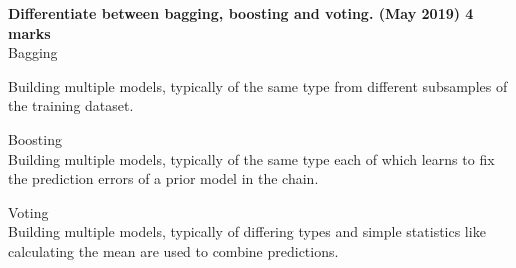 \textbf{\textcolor{LightMagenta}{Differentiate between bagging, boosting and voting. (May 2019) \hfill 4 marks}} \\[5pt]
\textcolor{ReddishRose} {Bagging} \\{ Building multiple models, typically of the same type from different subsamples of the training dataset. 

\textcolor{ReddishRose} {Boosting} \\ Building multiple models, typically of the same type each of which learns to fix the prediction errors of a prior model in the chain.

\textcolor{ReddishRose} {Voting} \\Building multiple models, typically of differing types and simple statistics like calculating the mean are used to combine predictions.}